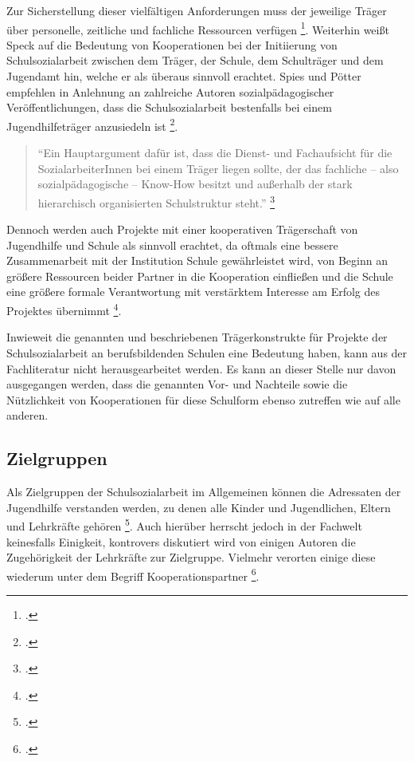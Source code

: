 \noindent
Zur Sicherstellung dieser vielfältigen Anforderungen muss der jeweilige Träger über personelle, zeitliche und fachliche Ressourcen verfügen \footcite[vgl.]{BIVSD2013}. Weiterhin weißt Speck auf die Bedeutung von Kooperationen bei der Initiierung von Schulsozialarbeit zwischen dem Träger, der Schule, dem Schulträger und dem Jugendamt hin, welche er als überaus sinnvoll erachtet. Spies und Pötter empfehlen in Anlehnung an zahlreiche Autoren sozialpädagogischer Veröffentlichungen, dass die Schulsozialarbeit bestenfalls bei einem Jugendhilfeträger anzusiedeln ist \footcite[64]{Spies2011}. 

\begin{quotation}
\noindent
"`Ein Hauptargument dafür ist, dass die Dienst- und Fachaufsicht für die SozialarbeiterInnen bei einem Träger liegen sollte, der das fachliche -- also sozialpädagogische -- Know-How besitzt und außerhalb der stark hierarchisch organisierten Schulstruktur steht."' \footcite[64]{Spies2011}
\end{quotation}

\noindent
Dennoch werden auch Projekte mit einer kooperativen Trägerschaft von Jugendhilfe und Schule als sinnvoll erachtet, da oftmals eine bessere Zusammenarbeit mit der Institution Schule gewährleistet wird, von Beginn an größere Ressourcen beider Partner in die Kooperation einfließen und die Schule eine größere formale Verantwortung mit verstärktem Interesse am Erfolg des Projektes übernimmt \footcite[vgl.][64]{Spies2011}.

Inwieweit die genannten und beschriebenen Trägerkonstrukte für Projekte der Schulsozialarbeit an berufsbildenden Schulen eine Bedeutung haben, kann aus der Fachliteratur nicht herausgearbeitet werden. Es kann an dieser Stelle nur davon ausgegangen werden, dass die genannten Vor- und Nachteile sowie die Nützlichkeit von Kooperationen für diese Schulform ebenso zutreffen wie auf alle anderen. 

\subsection{Zielgruppen}
\label{sec:Zielgruppen}

Als Zielgruppen der Schulsozialarbeit im Allgemeinen können die Adressaten der Jugendhilfe verstanden werden, zu denen alle Kinder und Jugendlichen, Eltern und Lehrkräfte gehören \footcite[vgl.][31]{Speck2007}. Auch hierüber herrscht jedoch in der Fachwelt keinesfalls Einigkeit, kontrovers diskutiert wird von einigen Autoren die Zugehörigkeit der Lehrkräfte zur Zielgruppe. Vielmehr verorten einige diese wiederum unter dem Begriff Kooperationspartner \footcite[vgl.][50]{Spies2011}. 

